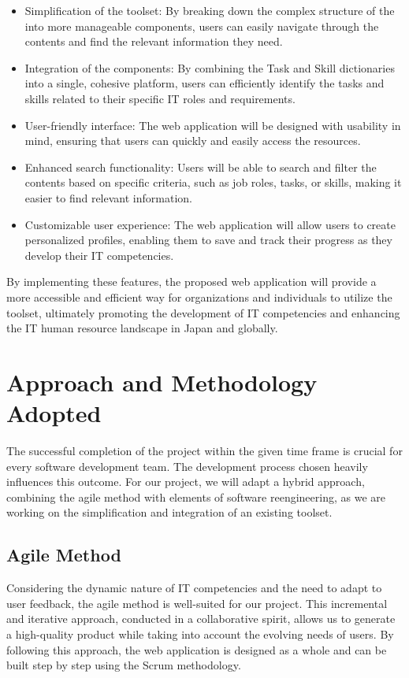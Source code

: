 \begin{itemize}

    \item Simplification of the  toolset: By breaking down the complex structure of the  into more manageable components, users can easily navigate through the contents and find the relevant information they need.
    \item Integration of the  components: By combining the Task and Skill dictionaries into a single, cohesive platform, users can efficiently identify the tasks and skills related to their specific IT roles and requirements.
    \item User-friendly interface: The web application will be designed with usability in mind, ensuring that users can quickly and easily access the  resources.
    \item Enhanced search functionality: Users will be able to search and filter the  contents based on specific criteria, such as job roles, tasks, or skills, making it easier to find relevant information.
    \item Customizable user experience: The web application will allow users to create personalized profiles, enabling them to save and track their progress as they develop their IT competencies.
          
\end{itemize}
By implementing these features, the proposed web application will provide a more accessible and efficient way for organizations and individuals to utilize the  toolset, ultimately promoting the development of IT competencies and enhancing the IT human resource landscape in Japan and globally.




\section{Approach and Methodology Adopted}
The successful completion of the project within the given time frame is crucial for every software development team. The development process chosen heavily influences this outcome. For our project, we will adapt a hybrid approach, combining the agile method with elements of software reengineering, as we are working on the simplification and integration of an existing toolset.

\subsection{Agile Method}
Considering the dynamic nature of IT competencies and the need to adapt to user feedback, the agile method is well-suited for our project. This incremental and iterative approach, conducted in a collaborative spirit, allows us to generate a high-quality product while taking into account the evolving needs of users. By following this approach, the web application is designed as a whole and can be built step by step using the Scrum methodology.


